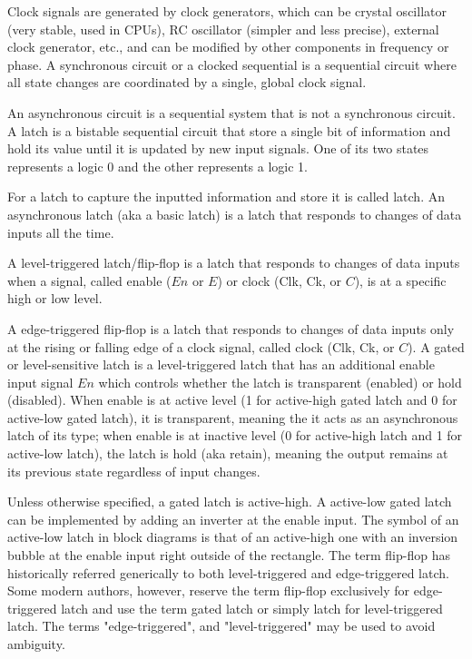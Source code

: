 \documentclass[a4paper,12pt]{report}
\begin{document}
Clock signals are generated by clock generators, which can be crystal oscillator (very stable, used in CPUs), RC oscillator (simpler and less precise), external clock generator, etc., and can be modified by other components in frequency or phase.
A synchronous circuit or a clocked sequential is a sequential circuit where all state changes are coordinated by a single, global clock signal.

An asynchronous circuit is a sequential system that is not a synchronous circuit.
A latch is a bistable sequential circuit that store a single bit of information and hold its value until it is updated by new input signals. One of its two states represents a logic 0 and the other represents a logic 1.

For a latch to capture the inputted information and store it is called latch.
An asynchronous latch (aka a basic latch) is a latch that responds to changes of data inputs all the time.

A level-triggered latch/flip-flop is a latch that responds to changes of data inputs when a signal, called enable ($En$ or $E$) or clock (Clk, Ck, or $C$), is at a specific high or low level.

A edge-triggered flip-flop is a latch that responds to changes of data inputs only at the rising or falling edge of a clock signal, called clock (Clk, Ck, or $C$).
A gated or level-sensitive latch is a level-triggered latch that has an additional enable input signal $En$ which controls whether the latch is transparent (enabled) or hold (disabled). When enable is at active level (1 for active-high gated latch and 0 for active-low gated latch), it is transparent, meaning the it acts as an asynchronous latch of its type; when enable is at inactive level (0 for active-high latch and 1 for active-low latch), the latch is hold (aka retain), meaning the output remains at its previous state regardless of input changes.

Unless otherwise specified, a gated latch is active-high. A active-low gated latch can be implemented by adding an inverter at the enable input. The symbol of an active-low latch in block diagrams is that of an active-high one with an inversion bubble at the enable input right outside of the rectangle.
The term flip-flop has historically referred generically to both level-triggered and edge-triggered latch. Some modern authors, however, reserve the term flip-flop exclusively for edge-triggered latch and use the term gated latch or simply latch for level-triggered latch. The terms "edge-triggered", and "level-triggered" may be used to avoid ambiguity.
\end{document}
